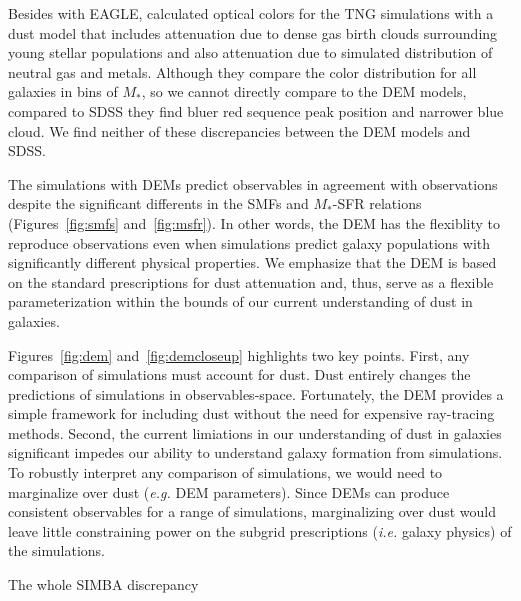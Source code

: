 Besides with EAGLE, \cite{nelson2018} calculated optical colors for the
TNG simulations with a dust model that includes attenuation due to dense gas 
birth clouds surrounding young stellar populations and also attenuation due to 
simulated distribution of neutral gas and metals.
Although they compare the color distribution for all galaxies in bins of $M_*$,
so we cannot directly compare to the DEM models, compared to SDSS they find 
bluer red sequence peak position and narrower blue cloud. We find neither of
these discrepancies between the DEM models and SDSS. 

The simulations with DEMs predict observables in agreement with observations 
despite the significant differents in the SMFs and $M_*$-SFR relations 
(Figures~\ref{fig:smfs} and~\ref{fig:msfr}). In other words, the DEM has the 
flexiblity to reproduce observations even when simulations predict galaxy
populations with significantly different physical properties. We emphasize that
the DEM is based on the standard prescriptions for dust attenuation and, thus,
serve as a flexible parameterization within the bounds of our current
understanding of dust in galaxies.

Figures~\ref{fig:dem} and~\ref{fig:demcloseup} highlights two key points. First, any comparison of
simulations must account for dust. Dust entirely changes the predictions of
simulations in observables-space. Fortunately, the DEM provides a simple framework
for including dust without the need for expensive ray-tracing methods. 
Second, the current limiations in our understanding of dust in galaxies 
significant impedes our ability to understand galaxy formation from simulations. 
To robustly interpret any comparison of simulations, we would need to
marginalize over dust (\emph{e.g.} DEM parameters). Since DEMs can produce
consistent observables for a range of simulations, marginalizing over dust
would leave little constraining power on the subgrid prescriptions (\emph{i.e.}
galaxy physics) of the simulations. 

The whole SIMBA discrepancy

